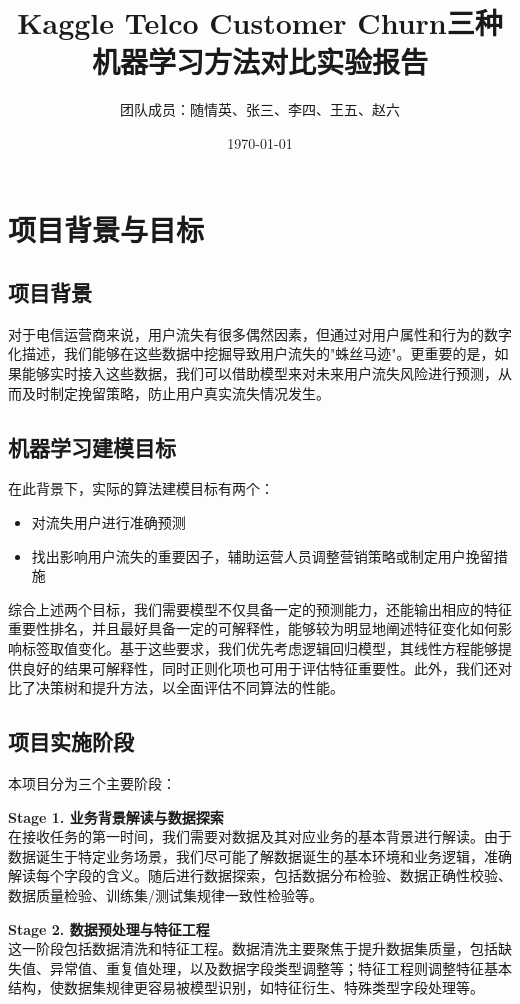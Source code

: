 \documentclass[12pt,a4paper]{article}
\title{Kaggle Telco Customer Churn三种机器学习方法对比实验报告}
\author{团队成员：随情英、张三、李四、王五、赵六}
\date{\today}
\begin{document}
\maketitle

\section{项目背景与目标}

\subsection{项目背景}
对于电信运营商来说，用户流失有很多偶然因素，但通过对用户属性和行为的数字化描述，我们能够在这些数据中挖掘导致用户流失的"蛛丝马迹"。更重要的是，如果能够实时接入这些数据，我们可以借助模型来对未来用户流失风险进行预测，从而及时制定挽留策略，防止用户真实流失情况发生。

\subsection{机器学习建模目标}
在此背景下，实际的算法建模目标有两个：
\begin{itemize}
    \item 对流失用户进行准确预测
    \item 找出影响用户流失的重要因子，辅助运营人员调整营销策略或制定用户挽留措施
\end{itemize}

综合上述两个目标，我们需要模型不仅具备一定的预测能力，还能输出相应的特征重要性排名，并且最好具备一定的可解释性，能够较为明显地阐述特征变化如何影响标签取值变化。基于这些要求，我们优先考虑逻辑回归模型，其线性方程能够提供良好的结果可解释性，同时正则化项也可用于评估特征重要性。此外，我们还对比了决策树和提升方法，以全面评估不同算法的性能。

\subsection{项目实施阶段}
本项目分为三个主要阶段：

\textbf{Stage 1. 业务背景解读与数据探索}\\
在接收任务的第一时间，我们需要对数据及其对应业务的基本背景进行解读。由于数据诞生于特定业务场景，我们尽可能了解数据诞生的基本环境和业务逻辑，准确解读每个字段的含义。随后进行数据探索，包括数据分布检验、数据正确性校验、数据质量检验、训练集/测试集规律一致性检验等。

\textbf{Stage 2. 数据预处理与特征工程}\\
这一阶段包括数据清洗和特征工程。数据清洗主要聚焦于提升数据集质量，包括缺失值、异常值、重复值处理，以及数据字段类型调整等；特征工程则调整特征基本结构，使数据集规律更容易被模型识别，如特征衍生、特殊类型字段处理等。
\end{document}
